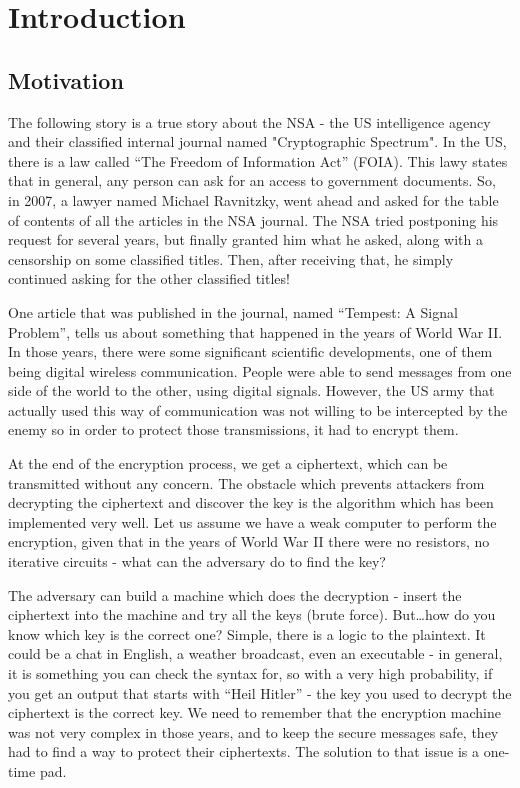 \chapter{Introduction} \label{chap:c1_IntroductionAOI}

\section{Motivation} \label{sec:Motivation} %

The following story is a true story about the NSA - the US intelligence agency
and their classified internal journal named "Cryptographic Spectrum".
In the US, there is a law called ``The Freedom of Information Act'' (FOIA). This lawy states that in general, any person can ask for an access to government documents.
So, in 2007, a lawyer named Michael Ravnitzky, went ahead and asked for the table of
contents of all the articles in the NSA journal. The NSA tried postponing his request for several years, but finally granted him what he asked, along with a censorship on some classified titles. Then, after receiving that, he simply continued asking for the other classified titles!

One article that was published in the journal, named ``Tempest: A Signal Problem'',
tells us about something that happened in the years of World War II. In those years,
there were some significant scientific developments, one of them being digital wireless
communication. People were able to send messages from one side of the world to the other, using digital signals. However, the US army that actually used this way of communication was not willing to be intercepted by the enemy so in order to protect those transmissions, it had to encrypt them. 

At the end of the encryption process, we get a ciphertext, which can be
transmitted without any concern. The obstacle which prevents attackers from
decrypting the ciphertext and discover the key is the algorithm which has been
implemented very well. Let us assume we have a weak computer to perform the
encryption, given that in the years of World War II there were no resistors, no
iterative circuits - what can the adversary do to find the key?

The adversary can build a machine which does the decryption - insert the
ciphertext into the machine and try all the keys (brute force). But\ldots how do
you know which key is the correct one? Simple, there is a logic to the plaintext.
It could be a chat in English, a weather broadcast, even an executable - in general, it is
something you can check the syntax for, so with a very high probability, if you get
an output that starts with ``Heil Hitler'' -  the key you used to decrypt the
ciphertext is the correct key. We need to remember that the encryption machine
was not very complex in those years, and to keep the secure messages safe, they
had to find a way to protect their ciphertexts. The solution to that issue is a
one-time pad.

